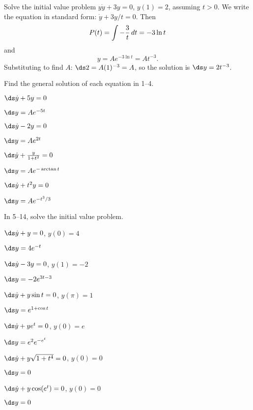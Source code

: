 \begin{example} Solve the initial value problem $y\dot y+3y=0$, $y(1)=2$,
assuming $t>0$. We
write the equation in standard form: $\dot y+3y/t=0$. Then
$$P(t)=\int -{3\over t}\,dt=-3\ln t$$
and 
$$ y=Ae^{-3\ln t}=At^{-3}.$$
Substituting to find $A$:
$\ds 2=A(1)^{-3}=A$, so the solution is $\ds y=2t^{-3}$.
\end{example}

\begin{exercises}

Find the general solution of each equation in 1--4.

\exercise $\ds\dot y+5y=0$
\begin{answer} $\ds y=Ae^{-5t}$
\end{answer}

\exercise $\ds\dot y-2y=0$
\begin{answer} $\ds y=Ae^{2t}$
\end{answer}

\exercise $\ds\dot y+{y\over 1+t^2}=0$
\begin{answer} $\ds y=Ae^{-\arctan t}$
\end{answer}

\exercise $\ds\dot y+t^2y=0$
\begin{answer} $\ds y=Ae^{-t^3/3}$
\end{answer}

In 5--14, solve the initial value problem.

\exercise $\ds\dot y + y=0$, $y(0)=4$
\begin{answer} $\ds y=4e^{-t}$
\end{answer}

\exercise $\ds\dot y -3y=0$, $y(1)=-2$
\begin{answer} $\ds y=-2e^{3t-3}$
\end{answer}

\exercise $\ds\dot y + y\sin t = 0$, $y(\pi)=1$
\begin{answer} $\ds y=e^{1+\cos t}$
\end{answer}

\exercise $\ds\dot y +ye^t=0$, $y(0)=e$
\begin{answer} $\ds y=e^2e^{-e^t}$
\end{answer}

\exercise $\ds\dot y +y\sqrt{1+t^4}=0$, $y(0)=0$
\begin{answer} $\ds y=0$
\end{answer}

\exercise $\ds\dot y + y\cos(e^t)=0$, $y(0)=0$
\begin{answer} $\ds y=0$
\end{answer}


\end{exercises}
